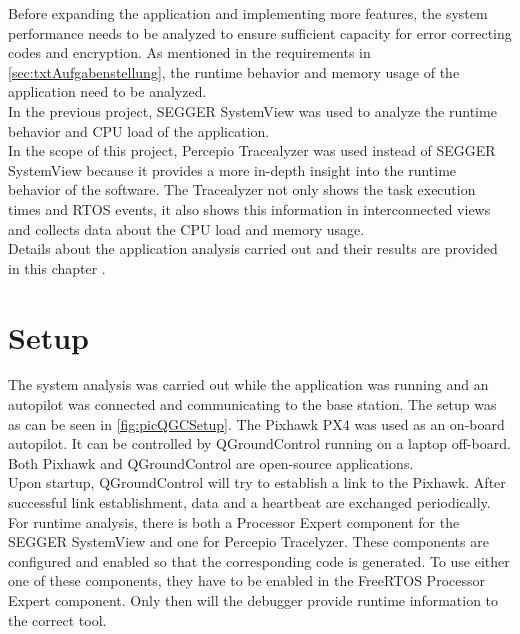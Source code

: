%
Before expanding the application and implementing more features, the system performance needs to be analyzed to ensure sufficient capacity for error correcting codes and encryption. As mentioned in the requirements in \autoref{sec:txtAufgabenstellung}, the runtime behavior and memory usage of the application need to be analyzed.\\
In the previous project, SEGGER SystemView was used to analyze the runtime behavior and CPU load of the application.\\
In the scope of this project, Percepio Tracealyzer was used instead of SEGGER SystemView because it provides a more in-depth insight into the runtime behavior of the software. The Tracealyzer not only shows the task execution times and RTOS events, it also shows this information in interconnected views and collects data about the CPU load and memory usage.\\
Details about the application analysis carried out and their results are provided in this chapter	.
%
%
\section{Setup}
%
The system analysis was carried out while the application was running and an autopilot was connected and communicating to the base station. The setup was as can be seen in \autoref{fig:picQGCSetup}. The Pixhawk PX4 was used as an on-board autopilot. It can be controlled by QGroundControl running on a laptop off-board. Both Pixhawk and QGroundControl are open-source applications.\\
Upon startup, QGroundControl will try to establish a link to the Pixhawk. After successful link establishment, data and a heartbeat are exchanged periodically.\\
For runtime analysis, there is both a Processor Expert component for the SEGGER SystemView and one for Percepio Tracelyzer. These components are configured and enabled so that the corresponding code is generated. To use either one of these components, they have to be enabled in the FreeRTOS Processor Expert component. Only then will the debugger provide runtime information to the correct tool.\\
%
%
